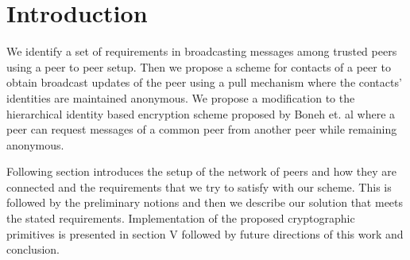 \section{Introduction}
We identify a set of requirements in broadcasting messages among trusted peers using a peer to peer setup. Then we propose a scheme for contacts of a peer to obtain broadcast updates of the peer using a pull mechanism where the contacts' identities are maintained anonymous. 
We propose a modification to the hierarchical identity based encryption scheme proposed by Boneh et. al \cite{BBG05} where a peer can request messages of a common peer from another peer while remaining anonymous.

Following section introduces the setup of the network of peers and how they are connected and the requirements that we try to satisfy with our scheme. This is followed by the preliminary notions and then we describe our solution that meets the stated requirements. Implementation of the proposed cryptographic primitives is presented in section V followed by future directions of this work and conclusion.
